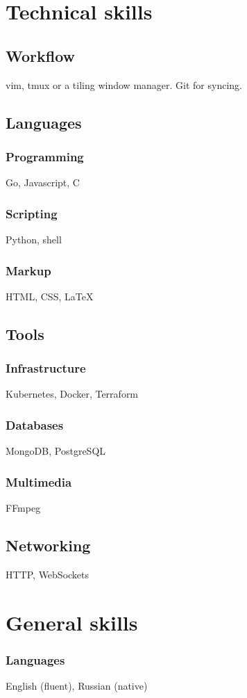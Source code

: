 \documentclass[a4paper,11pt]{article}
\begin{document}
\section{Technical skills}

\subsection{Workflow}
vim, tmux or a tiling window manager. Git for syncing.

\subsection{Languages}

\subsubsection{Programming}
Go, Javascript, C

\subsubsection{Scripting}
Python, shell

\subsubsection{Markup}
HTML, CSS, {\LaTeX}


\subsection{Tools}

\subsubsection{Infrastructure}
Kubernetes, Docker, Terraform

\subsubsection{Databases}
MongoDB, PostgreSQL

\subsubsection{Multimedia}
FFmpeg

\subsection{Networking}
HTTP, WebSockets

\section{General skills}

\subsubsection{Languages}
English (fluent), Russian (native)
\end{document}
